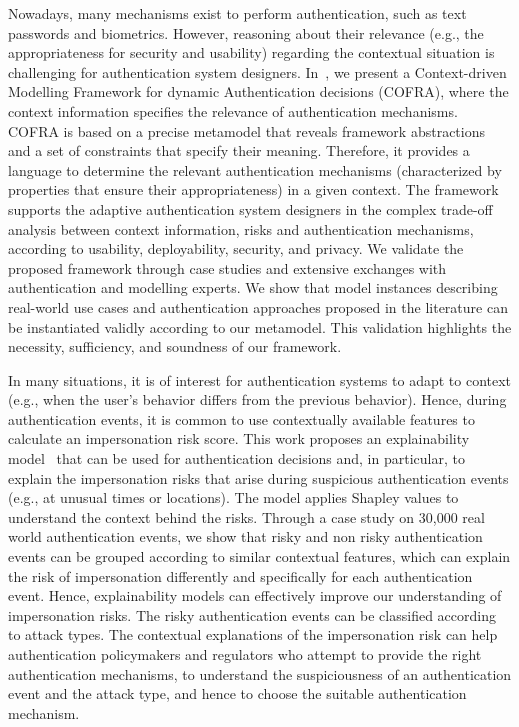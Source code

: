 Nowadays, many mechanisms exist to perform authentication, such as text passwords and biometrics. However, reasoning about their relevance (e.g., the appropriateness for security and usability) regarding the contextual situation is challenging for authentication system designers. In~\cite{bumiller:hal-03729080}, we present a Context-driven Modelling Framework for dynamic Authentication decisions (COFRA), where the context information specifies the relevance of authentication mechanisms. COFRA is based on a precise metamodel that reveals framework abstractions and a set of constraints that specify their meaning. Therefore, it provides a language to determine the relevant authentication mechanisms (characterized by properties that ensure their appropriateness) in a given context. The framework supports the adaptive authentication system designers in the complex trade-off analysis between context information, risks and authentication mechanisms, according to usability, deployability, security, and privacy. We validate the proposed framework through case studies and extensive exchanges with authentication and modelling experts. We show that model instances describing real-world use cases and authentication approaches proposed in the literature can be instantiated validly according to our metamodel. This validation highlights the necessity, sufficiency, and soundness of our framework.


In many situations, it is of interest for authentication systems to adapt to context (e.g., when the user's behavior differs from the previous behavior). Hence, during authentication events, it is common to use contextually available features to calculate an impersonation risk score. This work proposes an explainability model~\cite{bumiller:hal-03789500} that can be used for authentication decisions and, in particular, to explain the impersonation risks that arise during suspicious authentication events (e.g., at unusual times or locations). The model applies Shapley values to understand the context behind the risks. Through a case study on 30,000 real world authentication events, we show that risky and non risky authentication events can be grouped according to similar contextual features, which can explain the risk of impersonation differently and specifically for each authentication event. Hence, explainability models can effectively improve our understanding of impersonation risks. The risky authentication events can be classified according to attack types. The contextual explanations of the impersonation risk can help authentication policymakers and regulators who attempt to provide the right authentication mechanisms, to understand the suspiciousness of an authentication event and the attack type, and hence to choose the suitable authentication mechanism.




